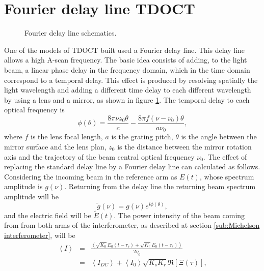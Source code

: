 \documentclass[12pt,twoside,english]{book}
\renewcommand{\~}{\perispomeni}%
\numberwithin{equation}{section}
\numberwithin{figure}{section}
\begin{document}
\section{Fourier delay line TDOCT}
\begin{figure}
\centering
\caption{Fourier delay line schematics.}
\label{fig:fdl}
\end{figure}

One of the models of TDOCT built used a Fourier delay line. This delay line allows a high A-scan frequency. The basic idea consists of adding, to the light beam, a linear phase delay in the frequency domain, which in the time domain correspond to a temporal delay. This effect is produced by resolving spatially the light wavelength and adding a different time delay to each different wavelength by using a lens and a mirror, as shown in figure \ref{fig:fdl}. The temporal delay to each optical frequency is\cite{Rollins:1998p1700}
\begin{equation}
\phi\left(\theta\right)=\frac{8\pi\nu z_0\theta}{c}-\frac{8\pi f\left(\nu-\nu_0\right)\theta}{a\nu_0},
\label{eq:delay frequency}
\end{equation}
where $f$ is the lens focal length, $a$ is the grating pitch, $\theta$ is the angle between the mirror surface and the lens plan, $z_0$ is the distance between the mirror rotation axis and the trajectory of the beam central optical frequency $\nu_0$. The effect of replacing the standard delay line by a Fourier delay line can calculated as follows. Considering the incoming beam in the reference arm as $E\left(t\right)$, whose spectrum amplitude is $g\left(\nu\right)$. Returning from the delay line the returning beam spectrum amplitude will be
\begin{equation}
\tilde{g}\left(\nu\right)=g\left(\nu\right)e^{i\phi\left(\theta\right)},
\label{eq:fdl return spectrum amplitude}
\end{equation}
and the electric field will be $\tilde{E}\left(t\right)$. The power intensity of the beam coming from from both arms of the interferometer, as described at section \ref{sub:Michelson interferometer}, will be
\begin{eqnarray}
\left<I\right>&=&\frac{\left<\sqrt{K_{0}}E_{0}\left(t-\tau_{s}\right)+\sqrt{K_{r}}E_{0}\left(t-\tau_{r}\right)\right>}{2\eta_0}\\
&=&\left<I_{DC}\right>+\left<I_0\right>\sqrt{K_s K_r}\Re\left[{\Xi\left(\tau\right)}\right],
\label{eq:fdl interferometer output intensity}
\end{eqnarray}
\end{document}
